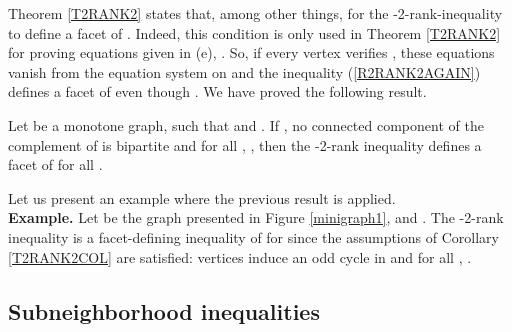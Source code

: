 Theorem \ref{T2RANK2} states that, among other things,  for the
-2-rank-inequality to define a facet of . Indeed,
this condition is only used in Theorem \ref{T2RANK2} for proving equations given in (e),
\ie . So, if every vertex  verifies
, these equations
vanish from the equation system on  and the inequality (\ref{R2RANK2AGAIN}) defines a facet of  even though . We have proved the following result.

\begin{tcor} \label{T2RANK2COL}
Let  be a monotone graph,  such that  and .
If , no connected component of the complement of 
is bipartite and for all , , then the -2-rank
inequality defines a facet of  for all .
\end{tcor}

Let us present an example where the previous result is applied.\\

\noindent \textbf{Example.} Let  be the graph presented in Figure \ref{minigraph1},  and .
The -2-rank inequality is a facet-defining inequality of  for  since the
assumptions of Corollary \ref{T2RANK2COL} are satisfied: vertices  induce an odd cycle in
 and for all , .

\subsection{Subneighborhood inequalities}

